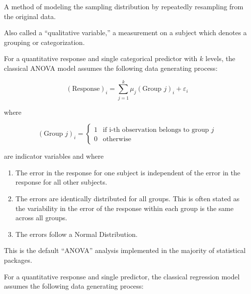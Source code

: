 \documentclass[
  letterpaper,
  DIV=11,
  numbers=noendperiod]{scrreprt}
\providecommand{\tightlist}{%
  \setlength{\itemsep}{0pt}\setlength{\parskip}{0pt}}\usepackage{longtable,booktabs,array}
\theoremstyle{definition}
\theoremstyle{definition}
\theoremstyle{plain}
\theoremstyle{remark}
\begin{document}
\begin{description}
\tightlist
\item[Bootstrapping (Definition~\ref{def-bootstrap})]
A method of modeling the sampling distribution by repeatedly resampling
from the original data.
\item[Categorical Variable (Definition~\ref{def-categorical})]
Also called a ``qualitative variable,'' a measurement on a subject which
denotes a grouping or categorization.
\item[Classical ANOVA Model (Definition~\ref{def-classical-anova})]
For a quantitative response and single categorical predictor with \(k\)
levels, the classical ANOVA model assumes the following data generating
process:
\end{description}

\[(\text{Response})_i = \sum_{j=1}^{k} \mu_j (\text{Group } j)_i + \varepsilon_i\]

where

\[
(\text{Group } j)_{i} = \begin{cases}
  1 & \text{if i-th observation belongs to group } j \\
  0 & \text{otherwise}
  \end{cases}
\]

are indicator variables and where

\begin{enumerate}
\def\labelenumi{\arabic{enumi}.}
\tightlist
\item
  The error in the response for one subject is independent of the error
  in the response for all other subjects.
\item
  The errors are identically distributed for all groups. This is often
  stated as the variability in the error of the response within each
  group is the same across all groups.
\item
  The errors follow a Normal Distribution.
\end{enumerate}

This is the default ``ANOVA'' analysis implemented in the majority of
statistical packages.

\begin{description}
\tightlist
\item[Classical Regression Model
(Definition~\ref{def-classical-regression})]
For a quantitative response and single predictor, the classical
regression model assumes the following data generating process:
\end{description}
\end{document}
